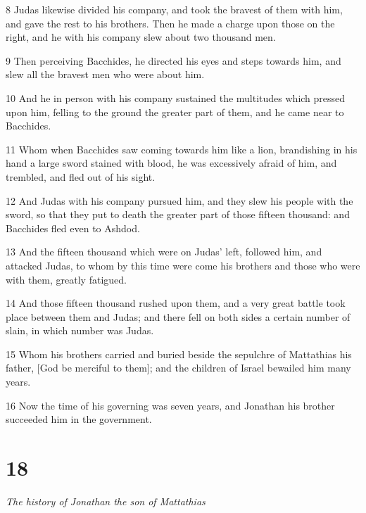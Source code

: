 \par 8 Judas likewise divided his company, and took the bravest of them with him, and gave the rest to his brothers. Then he made a charge upon those on the right, and he with his company slew about two thousand men. 

\par 9 Then perceiving Bacchides, he directed his eyes and steps towards him, and slew all the bravest men who were about him. 

\par 10 And he in person with his company sustained the multitudes which pressed upon him, felling to the ground the greater part of them, and he came near to Bacchides. 

\par 11 Whom when Bacchides saw coming towards him like a lion, brandishing in his hand a large sword stained with blood, he was excessively afraid of him, and trembled, and fled out of his sight. 

\par 12 And Judas with his company pursued him, and they slew his people with the sword, so that they put to death the greater part of those fifteen thousand: and Bacchides fled even to Ashdod. 

\par 13 And the fifteen thousand which were on Judas’ left, followed him, and attacked Judas, to whom by this time were come his brothers and those who were with them, greatly fatigued. 

\par 14 And those fifteen thousand rushed upon them, and a very great battle took place between them and Judas; and there fell on both sides a certain number of slain, in which number was Judas. 

\par 15 Whom his brothers carried and buried beside the sepulchre of Mattathias his father, [God be merciful to them]; and the children of Israel bewailed him many years. 

\par 16 Now the time of his governing was seven years, and Jonathan his brother succeeded him in the government. 

\chapter{18}

\par \textit{The history of Jonathan the son of Mattathias}


